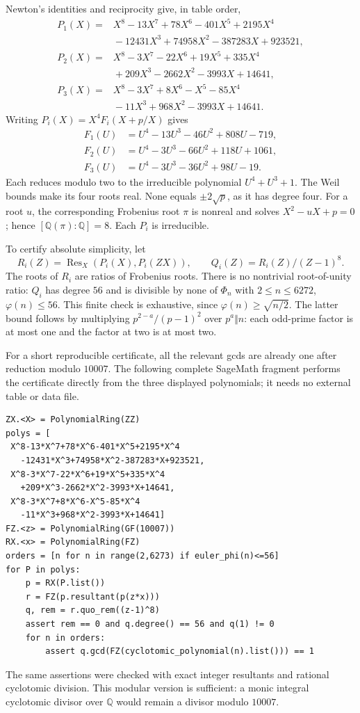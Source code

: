 \documentclass[11pt,a4paper]{article}
\theoremstyle{definition}
\theoremstyle{remark}
\numberwithin{equation}{section}
\begin{document}
Newton's identities and reciprocity give, in table order,
\begin{align*}
P_1(X)={}&X^8-13X^7+78X^6-401X^5+2195X^4\\
 &{}-12431X^3+74958X^2-387283X+923521,\\
P_2(X)={}&X^8-3X^7-22X^6+19X^5+335X^4\\
 &{}+209X^3-2662X^2-3993X+14641,\\
P_3(X)={}&X^8-3X^7+8X^6-X^5-85X^4\\
 &{}-11X^3+968X^2-3993X+14641.
\end{align*}
Writing $P_i(X)=X^4F_i(X+p/X)$ gives
\begin{align*}
F_1(U)&=U^4-13U^3-46U^2+808U-719,\\
F_2(U)&=U^4-3U^3-66U^2+118U+1061,\\
F_3(U)&=U^4-3U^3-36U^2+98U-19.
\end{align*}
Each reduces modulo two to the irreducible polynomial $U^4+U^3+1$.
The Weil bounds make its four roots real. None equals $\pm2\sqrt p$,
as it has degree four. For a root $u$, the corresponding Frobenius
root $\pi$ is nonreal and solves $X^2-uX+p=0$; hence
$[\mathbb Q(\pi):\mathbb Q]=8$. Each $P_i$ is irreducible.

To certify absolute simplicity, let
\[
 R_i(Z)=\operatorname{Res}_X(P_i(X),P_i(ZX)),\qquad
 Q_i(Z)=R_i(Z)/(Z-1)^8.
\]
The roots of $R_i$ are ratios of Frobenius roots. There is no
nontrivial root-of-unity ratio: $Q_i$ has degree $56$ and is divisible
by none of $\Phi_n$ with $2\le n\le6272$, $\varphi(n)\le56$.
This finite check is exhaustive, since
$\varphi(n)\ge\sqrt{n/2}$. The latter bound follows by multiplying
$p^{2-a}/(p-1)^2$ over $p^a\Vert n$: each odd-prime factor is at most
one and the factor at two is at most two.

For a short reproducible certificate, all the relevant gcds are already
one after reduction modulo $10007$. The following complete SageMath
fragment performs the certificate directly from the three displayed
polynomials; it needs no external table or data file.
\begin{verbatim}
ZX.<X> = PolynomialRing(ZZ)
polys = [
 X^8-13*X^7+78*X^6-401*X^5+2195*X^4
   -12431*X^3+74958*X^2-387283*X+923521,
 X^8-3*X^7-22*X^6+19*X^5+335*X^4
   +209*X^3-2662*X^2-3993*X+14641,
 X^8-3*X^7+8*X^6-X^5-85*X^4
   -11*X^3+968*X^2-3993*X+14641]
FZ.<z> = PolynomialRing(GF(10007))
RX.<x> = PolynomialRing(FZ)
orders = [n for n in range(2,6273) if euler_phi(n)<=56]
for P in polys:
    p = RX(P.list())
    r = FZ(p.resultant(p(z*x)))
    q, rem = r.quo_rem((z-1)^8)
    assert rem == 0 and q.degree() == 56 and q(1) != 0
    for n in orders:
        assert q.gcd(FZ(cyclotomic_polynomial(n).list())) == 1
\end{verbatim}
The same assertions were checked with exact integer resultants and
rational cyclotomic division. This modular version is sufficient:
a monic integral cyclotomic divisor over $\mathbb Q$ would remain a
divisor modulo $10007$.
\end{document}
